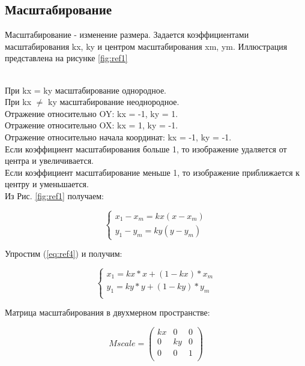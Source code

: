 \subsection {Масштабирование}

Масштабирование - изменение размера. Задается коэффициентами масштабирования kx, ky и центром масштабирования xm, ym. Иллюстрация представлена на рисунке \ref{fig:ref1} \\
\begin{figure}[ht!]
\end{figure}
\\
При kx = ky масштабирование однородное.\\
При kx $\neq$ ky масштабирование неоднородное.\\
Отражение относительно OY: kx = -1, ky = 1.\\
Отражение относительно OX: kx = 1, ky = -1.\\
Отражение относительно начала координат: kx = -1, ky = -1.\\
Если коэффициент масштабирования больше 1, то изображение удаляется от центра и увеличивается.\\
Если коэффициент масштабирование меньше 1, то изображение приближается к центру и уменьшается.\\

Из Рис. \ref{fig:ref1} получаем:

\begin{equation}
	{\begin{cases}
			x_1 - x_m = kx(x - x_m) \\
			y_1 - y_m = ky(y - y_m)
			\label{eq:ref4}
		\end{cases}}
\end{equation}

Упростим (\ref{eq:ref4}) и получим:

\begin{equation}
	{\begin{cases}
			x_1 = kx * x + (1 - kx) * x_m \\
			y_1 = ky * y + (1 - ky) * y_m \\
		\end{cases}}
\end{equation}

Матрица масштабирования в двухмерном пространстве:

\begin{equation}
	Mscale = \left(
	\begin{array}{cccc}
			kx & 0  & 0 \\
			0  & ky & 0 \\
			0  & 0  & 1 \\
		\end{array}
	\right)
\end{equation}

